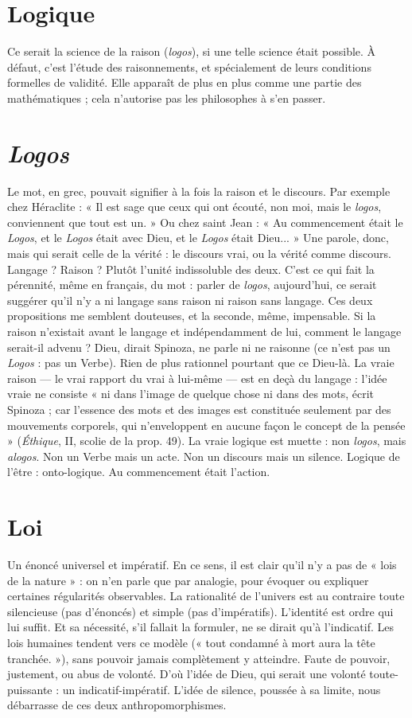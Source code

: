 {\section{Logique}
Ce serait la science de la raison ({\it logos}), si une telle science était
possible. À défaut, c’est l'étude des raisonnements, et spécialement
de leurs conditions formelles de validité. Elle apparaît de plus en plus
comme une partie des mathématiques ; cela n’autorise pas les philosophes à
s’en passer.

\section{{\it Logos}}
Le mot, en grec, pouvait signifier à la fois la raison et le discours.
Par exemple chez Héraclite : « Il est sage que ceux qui ont écouté,
non moi, mais le {\it logos}, conviennent que tout est un. » Ou chez saint Jean : « Au
commencement était le {\it Logos}, et le {\it Logos} était avec Dieu, et le {\it Logos} était
Dieu... » Une parole, donc, mais qui serait celle de la vérité : le discours vrai,
ou la vérité comme discours. Langage ? Raison ? Plutôt l’unité indissoluble des
deux. C’est ce qui fait la pérennité, même en français, du mot : parler de {\it logos},
aujourd’hui, ce serait suggérer qu’il n’y a ni langage sans raison ni raison sans
langage. Ces deux propositions me semblent douteuses, et la seconde, même,
impensable. Si la raison n’existait avant le langage et indépendamment de lui,
comment le langage serait-il advenu ? Dieu, dirait Spinoza, ne parle ni ne raisonne
(ce n’est pas un {\it Logos} : pas un Verbe). Rien de plus rationnel pourtant
que ce Dieu-là. La vraie raison — le vrai rapport du vrai à lui-même — est en
deçà du langage : l’idée vraie ne consiste « ni dans l’image de quelque chose ni
dans des mots, écrit Spinoza ; car l’essence des mots et des images est constituée
seulement par des mouvements corporels, qui n’enveloppent en aucune façon
le concept de la pensée » ({\it Éthique}, II, scolie de la prop. 49). La vraie logique est
muette : non {\it logos}, mais {\it alogos}. Non un Verbe mais un acte. Non un discours
mais un silence. Logique de l’être : onto-logique. Au commencement était
l'action.

\section{Loi}
Un énoncé universel et impératif. En ce sens, il est clair qu’il n’y a pas
de « lois de la nature » : on n’en parle que par analogie, pour évoquer
ou expliquer certaines régularités observables. La rationalité de l’univers est au
contraire toute silencieuse (pas d’énoncés) et simple (pas d’impératifs). L’identité
est ordre qui lui suffit. Et sa nécessité, s’il fallait la formuler, ne se dirait
qu’à l’indicatif. Les lois humaines tendent vers ce modèle (« tout condamné à
mort aura la tête tranchée. »), sans pouvoir jamais complètement y atteindre.
Faute de pouvoir, justement, ou abus de volonté. D’où l’idée de Dieu, qui
serait une volonté toute-puissante : un indicatif-impératif. L'idée de silence,
poussée à sa limite, nous débarrasse de ces deux anthropomorphismes.

}
